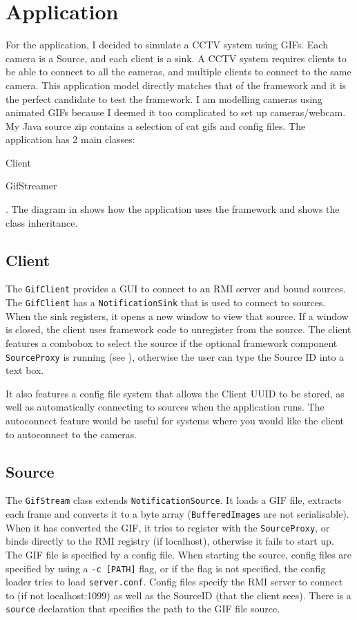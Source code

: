 \documentclass[a4paper]{article}
\begin{document}
\section{Application}
For the application, I decided to simulate a CCTV system using GIFs.
Each camera is a Source, and each client is a sink.
A CCTV system requires clients to be able to connect to all the cameras, and multiple clients to connect to the same camera.
This application model directly matches that of the framework and it is the perfect candidate to test the framework.
I am modelling cameras using animated GIFs because I deemed it too complicated to set up cameras/webcam.
My Java source zip contains a selection of cat gifs and config files. The application has 2 main classes:
\begin{enumerate*}
  \item Client
  \item GifStreamer
\end{enumerate*}.
The diagram in  shows how the application uses the framework and shows the class inheritance.

\subsection{Client}
The \texttt{GifClient} provides a GUI to connect to an RMI server and bound sources.
The \texttt{GifClient} has a \texttt{NotificationSink} that is used to connect to sources.
When the sink registers, it opens a new window to view that source.
If a window is closed, the client uses framework code to unregister from the source.
The client features a combobox to select the source if the optional framework component \texttt{SourceProxy} is running (see ), otherwise the user can type the Source ID into a text box.

It also features a config file system that allows the Client UUID to be stored, as well as automatically connecting to sources when the application runs.
The autoconnect feature would be useful for systems where you would like the client to autoconnect to the cameras.

\subsection{Source}
The \texttt{GifStream} class extends \texttt{NotificationSource}.
It loads a GIF file, extracts each frame and converts it to a byte array (\texttt{BufferedImages} are not serialisable).
When it has converted the GIF, it tries to register with the \texttt{SourceProxy}, or binds directly to the RMI registry (if localhost), otherwise it fails to start up.
The GIF file is specified by a config file.
When starting the source, config files are specified by using a \texttt{-c [PATH]} flag, or if the flag is not specified, the config loader tries to load \texttt{server.conf}.
Config files specify the RMI server to connect to (if not localhost:1099) as well as the SourceID (that the client sees).
There is a \texttt{source} declaration that specifies the path to the GIF file source.
\end{document}
